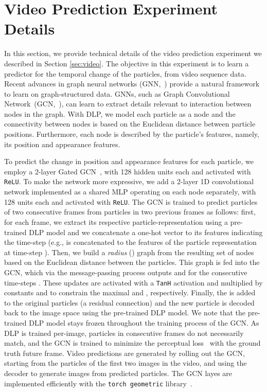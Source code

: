 \documentclass[nohyperref]{article}
\theoremstyle{plain}
\theoremstyle{definition}
\theoremstyle{remark}
\begin{document}
\section{Video Prediction Experiment Details}
\label{apndx:video}
In this section, we provide technical details of the video prediction experiment we described in Section \ref{sec:video}. The objective in this experiment is to learn a predictor for the temporal change of the particles, from video sequence data. Recent advances in graph neural networks (GNN,~\citealt{gnn09}) provide a natural framework to learn on graph-structured data. GNNs, such as Graph Convolutional Network~(GCN,~\citealt{kipf2016gcn}), can learn to extract details relevant to interaction between nodes in the graph. With DLP, we model each particle as a node and the connectivity between nodes is based on the Euclidean distance between particle positions. Furthermore, each node is described by the particle's features, namely, its position and appearance features.

To predict the change in position  and appearance features  for each particle, we employ a 2-layer Gated GCN~\citep{bresson2017gatedgcn}, with 128 hidden units each and activated with \texttt{ReLU}. To make the network more expressive, we add a 2-layer 1D convolutional network implemented as a shared MLP operating on each node separately, with 128 units each and activated with \texttt{ReLU}. The GCN is trained to predict particles of two consecutive frames  from particles in two previous frames  as follows: first, for each frame, we extract its respective particle-representation using a pre-trained DLP model and we concatenate a one-hot vector to its features indicating the time-step (e.g.,  is concatenated to the features of the particle representation at time-step ). Then, we build a \textit{radius} () graph from the resulting set of nodes based on the Euclidean distance between the particles. This graph is fed into the GCN, which via the message-passing process outputs   and  for the consecutive time-steps . These updates are activated with a \texttt{TanH} activation and multiplied by constants  and  to constrain the maximal  and , respectively. Finally, the  is added to the original particles (a residual connection) and the new particle is decoded back to the image space using the pre-trained DLP model. We note that the pre-trained DLP model stays frozen throughout the training process of the GCN. As DLP is trained per-image, particles in consecutive frames do not necessarily match, and the GCN is trained to minimize the perceptual loss~\citep{hoshen2019non} with the ground truth future frame. Video predictions are generated by rolling out the GCN, starting from the particles of the first two images in the video, and using the decoder to generate images from predicted particles. The GCN layes are implemented efficiently with the \texttt{torch geometric} library~\citep{feylensen19tgeom}.
 
\end{document}
